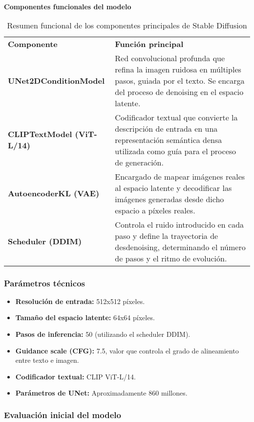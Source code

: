 \textbf{Componentes funcionales del modelo}  
\begin{table}[H]
\centering
\renewcommand{\arraystretch}{1.5}
\begin{tabular}{p{4.5cm}p{11cm}}
\rowcolor{gray!30}
\textbf{Componente} & \textbf{Función principal} \\
\rowcolor{gray!10}
\textbf{UNet2DConditionModel} & Red convolucional profunda que refina la imagen ruidosa en múltiples pasos, guiada por el texto. Se encarga del proceso de denoising en el espacio latente. \\
\textbf{CLIPTextModel (ViT-L/14)} & Codificador textual que convierte la descripción de entrada en una representación semántica densa utilizada como guía para el proceso de generación. \\
\rowcolor{gray!10}
\textbf{AutoencoderKL (VAE)} & Encargado de mapear imágenes reales al espacio latente y decodificar las imágenes generadas desde dicho espacio a píxeles reales. \\
\textbf{Scheduler (DDIM)} & Controla el ruido introducido en cada paso y define la trayectoria de desdenoising, determinando el número de pasos y el ritmo de evolución. \\
\end{tabular}
\caption{Resumen funcional de los componentes principales de Stable Diffusion}
\label{tab:sd-components}
\end{table}

\subsubsection{Parámetros técnicos}  
\begin{itemize}
\item \textbf{Resolución de entrada:} 512x512 píxeles.
\item \textbf{Tamaño del espacio latente:} 64x64 píxeles.
\item \textbf{Pasos de inferencia:} 50 (utilizando el scheduler DDIM).
\item \textbf{Guidance scale (CFG):} 7.5, valor que controla el grado de alineamiento entre texto e imagen.
\item \textbf{Codificador textual:} CLIP ViT-L/14.
\item \textbf{Parámetros de UNet:} Aproximadamente 860 millones.
\end{itemize}

\subsubsection{Evaluación inicial del modelo}

